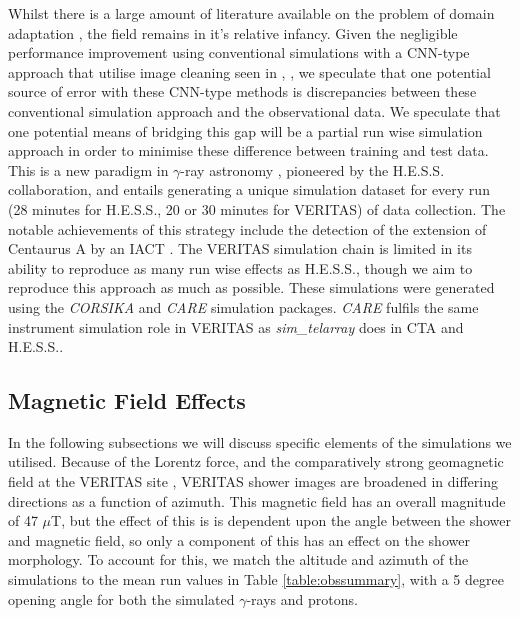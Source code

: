 Whilst there is a large amount of literature available on the problem of domain adaptation \cite{ada}, the field remains in it's relative infancy. Given the negligible performance improvement using conventional simulations with a CNN-type approach that utilise image cleaning seen in \cite{Shilon}, \cite{ParsonsOhm}, we speculate that one potential source of error with these CNN-type methods is discrepancies between these conventional simulation approach and the observational data. We speculate that one potential means of bridging this gap will be a partial run wise simulation approach in order to minimise these difference between training and test data. This is a new paradigm in $\gamma$-ray astronomy \cite{rws}, pioneered by the H.E.S.S. collaboration, and entails generating a unique simulation dataset for every run (28 minutes for H.E.S.S., 20 or 30 minutes for VERITAS) of data collection. The notable achievements of this strategy include the detection of the extension of Centaurus A by an IACT \cite{cena}. The VERITAS simulation chain is limited in its ability to reproduce as many run wise effects as H.E.S.S., though we aim to reproduce this approach as much as possible. These simulations were generated using the \textit{CORSIKA} and \textit{CARE} \cite{CARE} simulation packages. \textit{CARE} fulfils the same instrument simulation role in VERITAS as \textit{sim\_telarray} does in CTA and H.E.S.S..

\subsection{Magnetic Field Effects}
In the following subsections we will discuss specific elements of the simulations we utilised. Because of the Lorentz force, and the comparatively strong geomagnetic field at the VERITAS site \cite{kraus}, VERITAS shower images are broadened in differing directions as a function of azimuth. This magnetic field has an overall magnitude of 47 $\mu$T, but the effect of this is is dependent upon the angle between the shower and magnetic field, so only a component of this has an effect on the shower morphology.  To account for this, we match the altitude and azimuth of the simulations to the mean run values in Table \ref{table:obssummary}, with a 5 degree opening angle for both the simulated $\gamma$-rays and protons.

